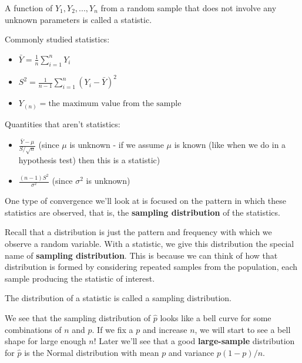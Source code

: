 \documentclass[
]{article}
\providecommand{\tightlist}{%
  \setlength{\itemsep}{0pt}\setlength{\parskip}{0pt}}
\begin{document}
\begin{description}
\tightlist
\item[Statistic]
A function of \(Y_1,Y_2,...,Y_n\) from a random sample that does not
involve any unknown parameters is called a statistic.
\end{description}

Commonly studied statistics:

\begin{itemize}
\tightlist
\item
  \(\bar{Y} = \frac{1}{n}\sum_{i=1}^n Y_i\)
\item
  \(S^2 = \frac{1}{n-1}\sum_{i=1}^{n}(Y_i-\bar{Y})^2\)
\item
  \(Y_{(n)} = \mbox{the maximum value from the sample}\)
\end{itemize}

Quantities that aren't statistics:

\begin{itemize}
\tightlist
\item
  \(\frac{\bar{Y}-\mu}{S/\sqrt{n}}\) (since \(\mu\) is unknown - if we
  assume \(\mu\) is known (like when we do in a hypothesis test) then
  this is a statistic)
\item
  \(\frac{(n-1)S^2}{\sigma^2}\) (since \(\sigma^2\) is unknown)
\end{itemize}

One type of convergence we'll look at is focused on the pattern in which
these statistics are observed, that is, the \textbf{sampling
distribution} of the statistics.

Recall that a distribution is just the pattern and frequency with which
we observe a random variable. With a statistic, we give this
distribution the special name of \textbf{sampling distribution}. This is
because we can think of how that distribution is formed by considering
repeated samples from the population, each sample producing the
statistic of interest.

\begin{description}
\tightlist
\item[Sampling Distribution]
The distribution of a statistic is called a sampling distribution.
\end{description}

We see that the sampling distribution of \(\hat{p}\) looks like a bell
curve for some combinations of \(n\) and \(p\). If we fix a \(p\) and
increase \(n\), we will start to see a bell shape for large enough
\(n\)! Later we'll see that a good \textbf{large-sample} distribution
for \(\hat{p}\) is the Normal distribution with mean \(p\) and variance
\(p(1-p)/n\).
\end{document}

